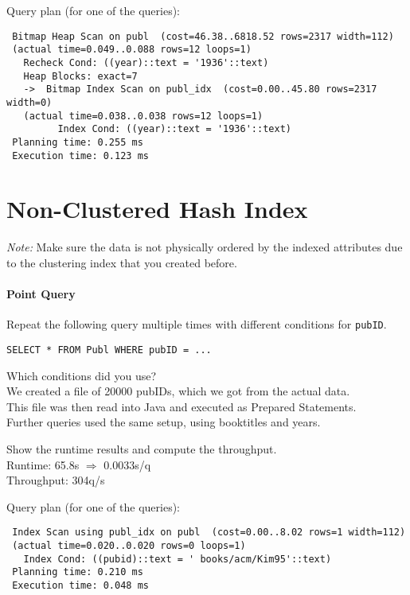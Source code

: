 \documentclass[11pt]{scrartcl}
\begin{document}
\smallskip\noindent
Query plan (for one of the queries):
{\small
\begin{verbatim}
 Bitmap Heap Scan on publ  (cost=46.38..6818.52 rows=2317 width=112)
 (actual time=0.049..0.088 rows=12 loops=1)
   Recheck Cond: ((year)::text = '1936'::text)
   Heap Blocks: exact=7
   ->  Bitmap Index Scan on publ_idx  (cost=0.00..45.80 rows=2317 width=0)
   (actual time=0.038..0.038 rows=12 loops=1)
         Index Cond: ((year)::text = '1936'::text)
 Planning time: 0.255 ms
 Execution time: 0.123 ms

\end{verbatim}
}

\section{Non-Clustered Hash Index}

\noindent \emph{Note:} Make sure the data is not physically ordered by
the indexed attributes due to the clustering index that you created
before.

\paragraph{Point Query}

Repeat the following query multiple times with different conditions for {\tt pubID}.

{\small
\begin{verbatim}
SELECT * FROM Publ WHERE pubID = ...
\end{verbatim}
}

\noindent
Which conditions did you use?\\
We created a file of 20000 pubIDs, which we got from the actual data.\\
This file was then read into Java and executed as Prepared Statements.\\
Further queries used the same setup, using booktitles and years.

\smallskip\noindent
Show the runtime results and compute the throughput.\\
Runtime: 65.8s $\Rightarrow$ 0.0033s/q\\
Throughput: 304q/s

\smallskip\noindent
Query plan (for one of the queries):
{\small
\begin{verbatim}
 Index Scan using publ_idx on publ  (cost=0.00..8.02 rows=1 width=112)
 (actual time=0.020..0.020 rows=0 loops=1)
   Index Cond: ((pubid)::text = ' books/acm/Kim95'::text)
 Planning time: 0.210 ms
 Execution time: 0.048 ms
\end{verbatim}
}
\end{document}
